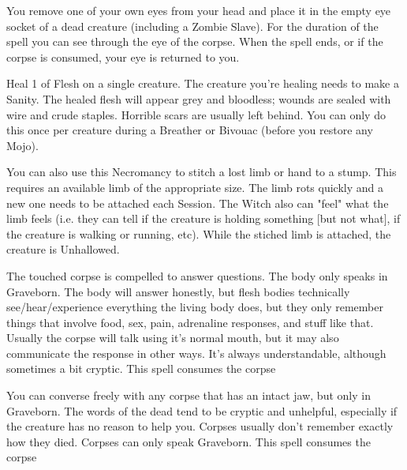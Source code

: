 {You remove one of your own eyes from your head and place it in the empty eye socket of a dead creature (including a Zombie Slave). For the duration of the spell you can see through the eye of the corpse.  When the spell ends, or if the corpse is consumed, your eye is returned to you.

\NECRO[
  Name=Knit Flesh,
  Link=necromancy-knit-flesh,
  Paradigm=Death,
  Save=N,
  Duration=0/Session,
  Mod=+9,
  Keywords=None,
  Target=Close (touch) creature
]


Heal 1 \HD of Flesh on a single creature. The creature you're healing needs to make a \RS Sanity.  The healed flesh will appear grey and bloodless; wounds are sealed with wire and crude staples.  Horrible scars are usually left behind. You can only do this once per creature during a Breather or Bivouac (before you restore any Mojo).

You can also use this Necromancy to stitch a lost limb or hand to a stump.  This requires an available limb of the appropriate size.  The limb rots quickly and a new one needs to be attached each Session.  The Witch also can "feel" what the limb feels (i.e. they can tell if the creature is holding something [but not what], if the creature is walking or running, etc).  While the stiched limb is attached, the creature is Unhallowed.


\NECRO[
  Name=Necrography,
  Link=necromancy-necrography,
  Paradigm=Death,
  Save=N,
  Duration=\LVL Minutes,
  Mod=+6,
  Keywords=None,
  Target=Close (touch) Mortal corpse
]

The touched corpse is compelled to answer \LVL questions.  The body only speaks in Graveborn. The body will answer honestly, but flesh bodies technically see/hear/experience everything the living body does, but they only remember things that involve food, sex, pain, adrenaline responses, and stuff like that. Usually the corpse will talk using it's normal mouth, but it may also communicate the response in other ways. It's always understandable, although sometimes a bit cryptic.  This spell consumes the corpse

\NECRO[
  Name=Speak with Dead,
  Link=necromancy-speak-with-dead,
  Paradigm=Death,
  Save=N,
  Duration=\LVL x2 Minutes,
  Mod=+3,
  Keywords=None,
  Target=Close (touch) Mortal corpse
]


You can converse freely with any corpse that has an intact jaw, but only in Graveborn. The words of the dead tend to be cryptic and unhelpful, especially if the creature has no reason to help you. Corpses usually don't remember exactly how they died. Corpses can only speak Graveborn.  This spell consumes the corpse

}
